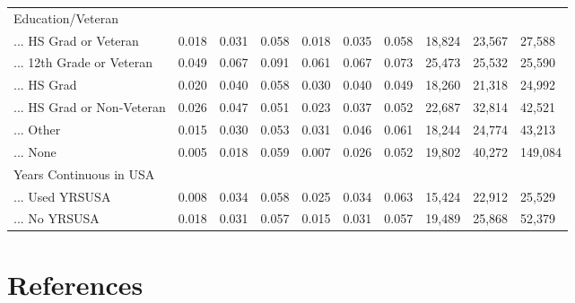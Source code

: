 \documentclass[
  letterpaper,
  DIV=11,
  numbers=noendperiod]{scrartcl}
\begin{document}
\begin{table}[!htbp]
{\begin{tabular}{llllllllll}
Education/Veteran &  &  &  &  &  &  &  &  &  \\ 
... HS Grad or Veteran & 0.018 & 0.031 & 0.058 & 0.018 & 0.035 & 0.058 & 18,824 & 23,567 & 27,588 \\ 
... 12th Grade or Veteran & 0.049 & 0.067 & 0.091 & 0.061 & 0.067 & 0.073 & 25,473 & 25,532 & 25,590 \\ 
... HS Grad & 0.020 & 0.040 & 0.058 & 0.030 & 0.040 & 0.049 & 18,260 & 21,318 & 24,992 \\ 
... HS Grad or Non-Veteran & 0.026 & 0.047 & 0.051 & 0.023 & 0.037 & 0.052 & 22,687 & 32,814 & 42,521 \\ 
... Other & 0.015 & 0.030 & 0.053 & 0.031 & 0.046 & 0.061 & 18,244 & 24,774 & 43,213 \\ 
... None & 0.005 & 0.018 & 0.059 & 0.007 & 0.026 & 0.052 & 19,802 & 40,272 & 149,084 \\ 
Years Continuous in USA &  &  &  &  &  &  &  &  &  \\ 
... Used YRSUSA & 0.008 & 0.034 & 0.058 & 0.025 & 0.034 & 0.063 & 15,424 & 22,912 & 25,529 \\ 
... No YRSUSA & 0.018 & 0.031 & 0.057 & 0.015 & 0.031 & 0.057 & 19,489 & 25,868 & 52,379\\ 
\hline
\hline
\end{tabular}
}
\end{table}

\hypertarget{references}{%
\section*{References}\label{references}}
\end{document}

